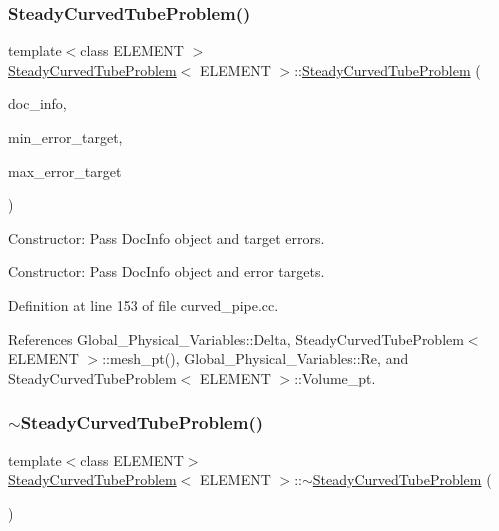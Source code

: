 \subsubsection{\texorpdfstring{Steady\+Curved\+Tube\+Problem()}{SteadyCurvedTubeProblem()}}
{\footnotesize\ttfamily template$<$class E\+L\+E\+M\+E\+NT $>$ \\
\hyperlink{classSteadyCurvedTubeProblem}{Steady\+Curved\+Tube\+Problem}$<$ E\+L\+E\+M\+E\+NT $>$\+::\hyperlink{classSteadyCurvedTubeProblem}{Steady\+Curved\+Tube\+Problem} (\begin{DoxyParamCaption}\item[{Doc\+Info \&}]{doc\+\_\+info,  }\item[{const double \&}]{min\+\_\+error\+\_\+target,  }\item[{const double \&}]{max\+\_\+error\+\_\+target }\end{DoxyParamCaption})}



Constructor\+: Pass Doc\+Info object and target errors. 

Constructor\+: Pass Doc\+Info object and error targets. 

Definition at line 153 of file curved\+\_\+pipe.\+cc.



References Global\+\_\+\+Physical\+\_\+\+Variables\+::\+Delta, Steady\+Curved\+Tube\+Problem$<$ E\+L\+E\+M\+E\+N\+T $>$\+::mesh\+\_\+pt(), Global\+\_\+\+Physical\+\_\+\+Variables\+::\+Re, and Steady\+Curved\+Tube\+Problem$<$ E\+L\+E\+M\+E\+N\+T $>$\+::\+Volume\+\_\+pt.

\mbox{\label{classSteadyCurvedTubeProblem_a1adfde23500217008be5445934830115}} 
\subsubsection{\texorpdfstring{$\sim$\+Steady\+Curved\+Tube\+Problem()}{~SteadyCurvedTubeProblem()}}
{\footnotesize\ttfamily template$<$class E\+L\+E\+M\+E\+NT$>$ \\
\hyperlink{classSteadyCurvedTubeProblem}{Steady\+Curved\+Tube\+Problem}$<$ E\+L\+E\+M\+E\+NT $>$\+::$\sim$\hyperlink{classSteadyCurvedTubeProblem}{Steady\+Curved\+Tube\+Problem} (\begin{DoxyParamCaption}{ }\end{DoxyParamCaption})\hspace{0.3cm}{\ttfamily [inline]}}



